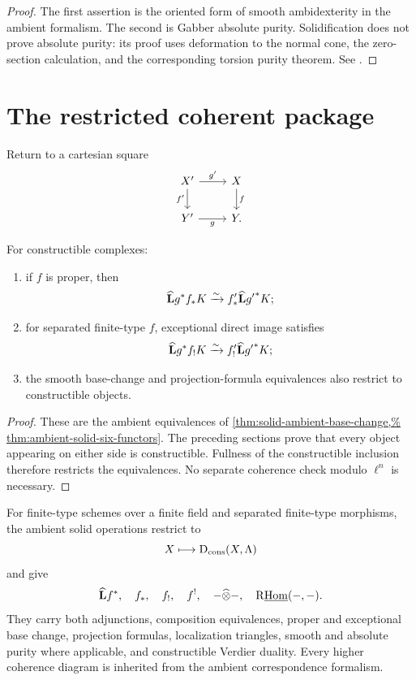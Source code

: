 \begin{proof}
The first assertion is the oriented form of smooth ambidexterity in the
ambient formalism.  The second is Gabber absolute purity.  Solidification
does not prove absolute purity: its proof uses deformation to the normal
cone, the zero-section calculation, and the corresponding torsion purity
theorem.  See \cite{ILOTravauxGabber}.
\end{proof}

\section{The restricted coherent package}

Return to a cartesian square
\begin{equation}
\label{eq:six-base-change-square}
\begin{tikzcd}
X' \arrow[r,"g'"] \arrow[d,"f'"'] & X \arrow[d,"f"] \\
Y' \arrow[r,"g"'] & Y.
\end{tikzcd}
\end{equation}

\begin{theorem}
\label{thm:proetale-base-change}
For constructible complexes:
\begin{enumerate}
\item if \(f\) is proper, then
\[
 \widehat{\mathbf L} g^*f_*K\xrightarrow{\sim}f'_*\widehat{\mathbf L}{g'}^*K;
\]
\item for separated finite-type \(f\), exceptional direct image satisfies
\[
 \widehat{\mathbf L} g^*f_!K\xrightarrow{\sim}f'_!\widehat{\mathbf L}{g'}^*K;
\]
\item the smooth base-change and projection-formula equivalences also
restrict to constructible objects.
\end{enumerate}
\end{theorem}

\begin{proof}
These are the ambient equivalences of
\cref{thm:solid-ambient-base-change,%
thm:ambient-solid-six-functors}.  The preceding sections prove that every
object appearing on either side is constructible.  Fullness of the
constructible inclusion therefore restricts the equivalences.  No separate
coherence check modulo \(\ell^n\) is necessary.
\end{proof}

\begin{theorem}
\label{thm:proetale-six-functor-package}
For finite-type schemes over a finite field and separated finite-type
morphisms, the ambient solid operations restrict to
\[
 X\longmapsto\mathrm D_{\mathrm{cons}}(X,\Lambda)
\]
and give
\[
 \widehat{\mathbf L} f^*,\quad f_*,\quad f_!,\quad f^!,\quad
 -\widehat\otimes-,\quad
 \mathrm R\underline{\operatorname{Hom}}(-,-).
\]
They carry both adjunctions, composition equivalences, proper and
exceptional base change, projection formulas, localization triangles,
smooth and absolute purity where applicable, and constructible Verdier
duality.  Every higher coherence diagram is inherited from the ambient
correspondence formalism.
\end{theorem}


